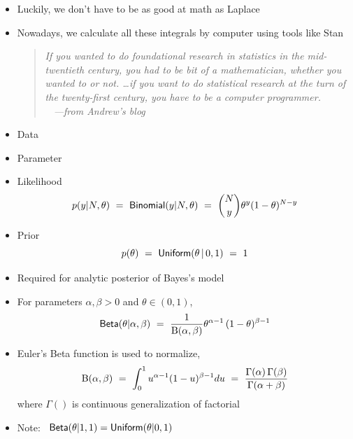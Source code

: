 \documentclass[10pt]{report}
\begin{document}
%
\begin{itemize}
\item Luckily, we don't have to be as good at math as Laplace
\item Nowadays, we calculate all these integrals by computer using
  tools like Stan
\vfill
\begin{quote}\slshape
  If you wanted to do foundational research in statistics in the
  mid-twentieth century, you had to be bit of a mathematician, whether
  you wanted to or not. \ldots if you want to do statistical research
  at the turn of the twenty-first century, you have to be a computer
  programmer.  \\[3pt] \mbox{ } \hfill {\small ---from Andrew's blog}
\end{quote}
\end{itemize}


%
\begin{itemize}
\item{Data}
\item Parameter
\item Likelihood
\[
p(y|N,\theta)
\ = \ \text{\sf Binomial}(y|N,\theta)
\ = \ \binom{N}{y} \theta^{y} (1 - \theta)^{N-y}
\]
\item Prior
\[
p(\theta)
\ = \ \text{\sf Uniform}(\theta \, | \, 0,1)
\ = \ 1
\]
\end{itemize}





%
\begin{itemize}
\item Required for analytic posterior of Bayes's model
\item For parameters $\alpha,\beta > 0$ and $\theta \in (0,1)$,
\[
\text{\sf Beta}(\theta|\alpha,\beta)
\ = \ \frac{1}{{\text B}(\alpha,\beta)}
      \theta^{\alpha - 1} \,
      (1 - \theta)^{\beta-1}
\]
\item Euler's Beta function is used to normalize,
\[
{\text B}(\alpha,\beta)
\ = \ \int_0^1 u^{\alpha-1}(1-u)^{\beta-1} du
\ = \ \frac{\Gamma(\alpha)\,\Gamma(\beta)}{\Gamma(\alpha + \beta)}
\]
where $\Gamma()$ is continuous generalization of factorial
\item Note: \ $\text{\sf Beta}(\theta|1,1) = \text{\sf Uniform}(\theta|0,1)$
\end{itemize}
\end{document}
